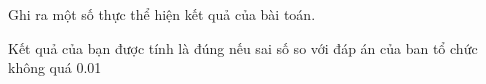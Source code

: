 Ghi ra một số thực thể hiện kết quả của bài toán.

Kết quả của bạn được tính là đúng nếu sai số so với đáp án của ban tổ chức không quá 0.01